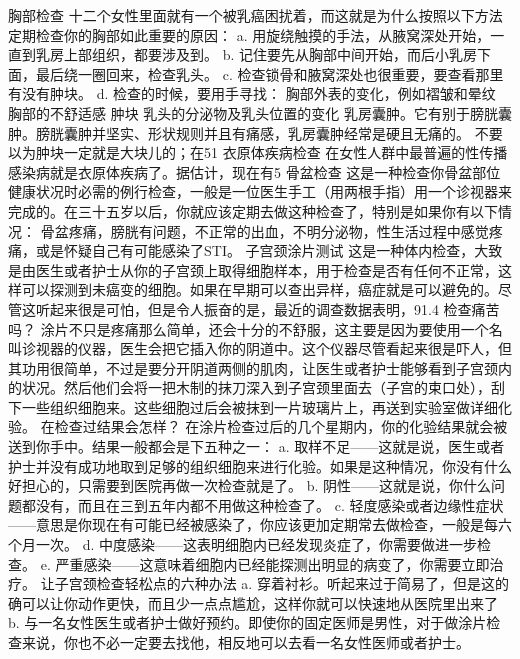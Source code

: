 \documentclass[12pt,UTF8]{ctexbook}
\begin{document}
胸部检查
十二个女性里面就有一个被乳癌困扰着，而这就是为什么按照以下方法定期检查你的胸部如此重要的原因：
a. 用旋绕触摸的手法，从腋窝深处开始，一直到乳房上部组织，都要涉及到。
b. 记住要先从胸部中间开始，而后小乳房下面，最后绕一圈回来，检查乳头。
c. 检查锁骨和腋窝深处也很重要，要查看那里有没有肿块。
d. 检查的时候，要用手寻找：
胸部外表的变化，例如褶皱和晕纹
胸部的不舒适感
肿块
乳头的分泌物及乳头位置的变化
乳房囊肿。它有别于膀胱囊肿。膀胱囊肿并坚实、形状规则并且有痛感，乳房囊肿经常是硬且无痛的。
不要以为肿块一定就是大块儿的；在51%
衣原体疾病检查
在女性人群中最普遍的性传播感染病就是衣原体疾病了。据估计，现在有5%
骨盆检查
这是一种检查你骨盆部位健康状况时必需的例行检查，一般是一位医生手工（用两根手指）用一个诊视器来完成的。在三十五岁以后，你就应该定期去做这种检查了，特别是如果你有以下情况：
骨盆疼痛，膀胱有问题，不正常的出血，不明分泌物，性生活过程中感觉疼痛，或是怀疑自己有可能感染了STI。
子宫颈涂片测试
这是一种体内检查，大致是由医生或者护士从你的子宫颈上取得细胞样本，用于检查是否有任何不正常，这样可以探测到未癌变的细胞。如果在早期可以查出异样，癌症就是可以避免的。尽管这听起来很是可怕，但是令人振奋的是，最近的调查数据表明，91.4%
检查痛苦吗？
涂片不只是疼痛那么简单，还会十分的不舒服，这主要是因为要使用一个名叫诊视器的仪器，医生会把它插入你的阴道中。这个仪器尽管看起来很是吓人，但其功用很简单，不过是要分开阴道两侧的肌肉，让医生或者护士能够看到子宫颈内的状况。然后他们会将一把木制的抹刀深入到子宫颈里面去（子宫的束口处），刮下一些组织细胞来。这些细胞过后会被抹到一片玻璃片上，再送到实验室做详细化验。
在检查过结果会怎样？
在涂片检查过后的几个星期内，你的化验结果就会被送到你手中。结果一般都会是下五种之一：
a. 取样不足——这就是说，医生或者护士并没有成功地取到足够的组织细胞来进行化验。如果是这种情况，你没有什么好担心的，只需要到医院再做一次检查就是了。
b. 阴性——这就是说，你什么问题都没有，而且在三到五年内都不用做这种检查了。
c. 轻度感染或者边缘性症状——意思是你现在有可能已经被感染了，你应该更加定期常去做检查，一般是每六个月一次。
d. 中度感染——这表明细胞内已经发现炎症了，你需要做进一步检查。
e. 严重感染——这意味着细胞内已经能探测出明显的病变了，你需要立即治疗。
让子宫颈检查轻松点的六种办法
a. 穿着衬衫。听起来过于简易了，但是这的确可以让你动作更快，而且少一点点尴尬，这样你就可以快速地从医院里出来了
b. 与一名女性医生或者护士做好预约。即使你的固定医师是男性，对于做涂片检查来说，你也不必一定要去找他，相反地可以去看一名女性医师或者护士。
\end{document}
